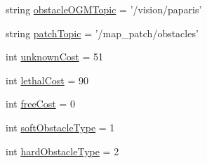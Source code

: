 \begin{DoxyCompactItemize}
\item 
string \hyperlink{namespacepandora__costmap_1_1map__patch__params_ab43c9fda9d7a5a46d97b78d05eeda976}{obstacle\-O\-G\-M\-Topic} = '/vision/paparis'
\item 
string \hyperlink{namespacepandora__costmap_1_1map__patch__params_aa5ad658af1965f024f6b4179697870cf}{patch\-Topic} = '/map\-\_\-patch/obstacles'
\item 
int \hyperlink{namespacepandora__costmap_1_1map__patch__params_a4a7e01b47b65a58140eca9ae4d83c1e6}{unknown\-Cost} = 51
\item 
int \hyperlink{namespacepandora__costmap_1_1map__patch__params_a95ac776a55555de6d43c8867a178f6fa}{lethal\-Cost} = 90
\item 
int \hyperlink{namespacepandora__costmap_1_1map__patch__params_a2fc402f2c468a46a9075b72fcf1ee46d}{free\-Cost} = 0
\item 
int \hyperlink{namespacepandora__costmap_1_1map__patch__params_a8b9d4fd9522c8594c84665b2f06d058d}{soft\-Obstacle\-Type} = 1
\item 
int \hyperlink{namespacepandora__costmap_1_1map__patch__params_a932dc5351ea50466e8425e52e5ae49ea}{hard\-Obstacle\-Type} = 2
\end{DoxyCompactItemize}


